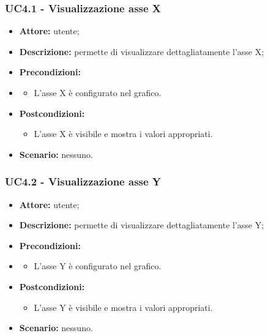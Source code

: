 \subsubsection{UC4.1 - Visualizzazione asse X}
\begin{itemize}
    \item \textbf{Attore:} utente;
    \item \textbf{Descrizione:} permette di visualizzare dettagliatamente l'asse X;
    \item \textbf{Precondizioni:} 
    \item \begin{itemize}
        \item L'asse X è configurato nel grafico.
    \end{itemize}
    \item \textbf{Postcondizioni:} 
    \begin{itemize}
        \item L'asse X è visibile e mostra i valori appropriati.
    \end{itemize}
    \item \textbf{Scenario:} nessuno.
\end{itemize}
\subsubsection{UC4.2 - Visualizzazione asse Y}
\begin{itemize}
    \item \textbf{Attore:} utente;
    \item \textbf{Descrizione:} permette di visualizzare dettagliatamente l'asse Y;
    \item \textbf{Precondizioni:} 
    \item \begin{itemize}
        \item L'asse Y è configurato nel grafico.
    \end{itemize}
    \item \textbf{Postcondizioni:} 
    \begin{itemize}
        \item L'asse Y è visibile e mostra i valori appropriati.
    \end{itemize}
    \item \textbf{Scenario:} nessuno.
\end{itemize}

